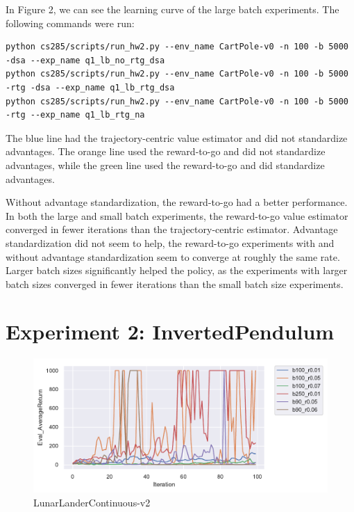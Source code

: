 \documentclass[letterpaper, 10pt]{article}
\begin{document}
In Figure 2, we can see the learning curve of the large batch experiments. The following commands were run:
\begin{lstlisting}[caption=Exact command line configurations]
python cs285/scripts/run_hw2.py --env_name CartPole-v0 -n 100 -b 5000 -dsa --exp_name q1_lb_no_rtg_dsa
python cs285/scripts/run_hw2.py --env_name CartPole-v0 -n 100 -b 5000 -rtg -dsa --exp_name q1_lb_rtg_dsa
python cs285/scripts/run_hw2.py --env_name CartPole-v0 -n 100 -b 5000 -rtg --exp_name q1_lb_rtg_na
\end{lstlisting}

The blue line had the trajectory-centric value estimator and did not standardize advantages. The orange line used the
reward-to-go and did not standardize advantages, while the green line used the reward-to-go and did standardize advantages.

Without advantage standardization, the reward-to-go had a better performance. In both the large and small batch experiments, the 
reward-to-go value estimator converged in fewer iterations than the trajectory-centric estimator. Advantage standardization 
did not seem to help, the reward-to-go experiments with and without advantage standardization seem to converge at roughly the
same rate. Larger batch sizes significantly helped the policy, as the experiments with larger batch sizes converged in fewer
iterations than the small batch size experiments.

\newpage

\section{Experiment 2: InvertedPendulum}

\begin{figure}[h]
\centering
\includegraphics{figures/q2.pdf}
\caption{LunarLanderContinuous-v2}
\end{figure}
\end{document}
